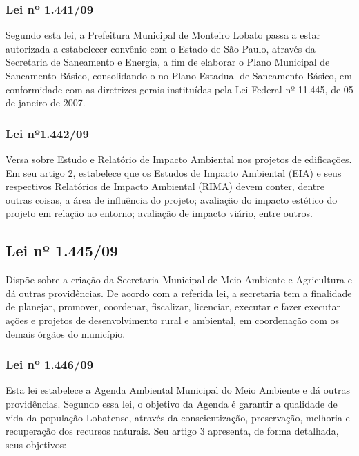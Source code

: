 	\subsubsection{Lei nº 1.441/09}
	Segundo esta lei, a Prefeitura Municipal de Monteiro Lobato passa a estar autorizada a estabelecer convênio com o Estado de São Paulo, através da Secretaria de Saneamento e Energia, a fim de elaborar o Plano Municipal de Saneamento Básico, consolidando-o no Plano Estadual de Saneamento Básico, em conformidade com as diretrizes gerais instituídas pela Lei Federal nº 11.445, de 05 de janeiro de 2007.
	
	\subsubsection{Lei nº1.442/09}
	
	Versa sobre Estudo e Relatório de Impacto Ambiental nos projetos de edificações. Em seu artigo 2, estabelece que os Estudos de Impacto Ambiental (EIA) e seus respectivos Relatórios de Impacto Ambiental (RIMA) devem conter, dentre outras coisas, a área de influência do projeto; avaliação do impacto estético do projeto em relação ao entorno; avaliação de impacto viário, entre outros.
	
	\subsection{Lei nº 1.445/09}
	
	Dispõe sobre a criação da Secretaria Municipal de Meio Ambiente e Agricultura e dá outras providências. De acordo com a referida lei, a secretaria tem a finalidade de planejar, promover, coordenar, fiscalizar, licenciar, executar e fazer executar ações e projetos de desenvolvimento rural e ambiental, em coordenação com os demais órgãos do município.
	
	\subsubsection{Lei nº 1.446/09}
	
	Esta lei estabelece a Agenda Ambiental Municipal do Meio Ambiente e dá outras providências. Segundo essa lei, o objetivo da Agenda é garantir a qualidade de vida da população Lobatense, através da conscientização, preservação, melhoria e recuperação dos recursos naturais. Seu artigo 3 apresenta, de forma detalhada, seus objetivos:
	
	

